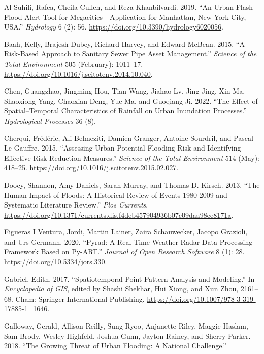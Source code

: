 \documentclass[11pt]{article}
\begin{document}
\newpage

\begin{hangparas}{1.5em}{1}
\hypertarget{citeproc_bib_item_1}{Al-Suhili, Rafea, Cheila Cullen, and Reza Khanbilvardi. 2019. “An Urban Flash Flood Alert Tool for Megacities—Application for Manhattan, New York City, USA.” \textit{Hydrology} 6 (2): 56. \url{https://doi.org/10.3390/hydrology6020056}.}

\hypertarget{citeproc_bib_item_2}{Baah, Kelly, Brajesh Dubey, Richard Harvey, and Edward McBean. 2015. “A Risk-Based Approach to Sanitary Sewer Pipe Asset Management.” \textit{Science of the Total Environment} 505 (February): 1011–17. \url{https://doi.org/10.1016/j.scitotenv.2014.10.040}.}

\hypertarget{citeproc_bib_item_3}{Chen, Guangzhao, Jingming Hou, Tian Wang, Jiahao Lv, Jing Jing, Xin Ma, Shaoxiong Yang, Chaoxian Deng, Yue Ma, and Guoqiang Ji. 2022. “The Effect of Spatial–Temporal Characteristics of Rainfall on Urban Inundation Processes.” \textit{Hydrological Processes} 36 (8).}

\hypertarget{citeproc_bib_item_4}{Cherqui, Frédéric, Ali Belmeziti, Damien Granger, Antoine Sourdril, and Pascal Le Gauffre. 2015. “Assessing Urban Potential Flooding Risk and Identifying Effective Risk-Reduction Measures.” \textit{Science of the Total Environment} 514 (May): 418–25. \url{https://doi.org/10.1016/j.scitotenv.2015.02.027}.}

\hypertarget{citeproc_bib_item_5}{Doocy, Shannon, Amy Daniels, Sarah Murray, and Thomas D. Kirsch. 2013. “The Human Impact of Floods: A Historical Review of Events 1980-2009 and Systematic Literature Review.” \textit{Plos Currents}. \url{https://doi.org/10.1371/currents.dis.f4deb457904936b07c09daa98ee8171a}.}

\hypertarget{citeproc_bib_item_6}{Figueras I Ventura, Jordi, Martin Lainer, Zaira Schauwecker, Jacopo Grazioli, and Urs Germann. 2020. “Pyrad: A Real-Time Weather Radar Data Processing Framework Based on Py-ART.” \textit{Journal of Open Research Software} 8 (1): 28. \url{https://doi.org/10.5334/jors.330}.}

\hypertarget{citeproc_bib_item_7}{Gabriel, Edith. 2017. “Spatiotemporal Point Pattern Analysis and Modeling.” In \textit{Encyclopedia of GIS}, edited by Shashi Shekhar, Hui Xiong, and Xun Zhou, 2161–68. Cham: Springer International Publishing. \url{https://doi.org/10.1007/978-3-319-17885-1_1646}.}

\hypertarget{citeproc_bib_item_8}{Galloway, Gerald, Allison Reilly, Sung Ryoo, Anjanette Riley, Maggie Haslam, Sam Brody, Wesley Highfeld, Joshua Gunn, Jayton Rainey, and Sherry Parker. 2018. “The Growing Threat of Urban Flooding: A National Challenge.”}


\end{hangparas}
\end{document}
